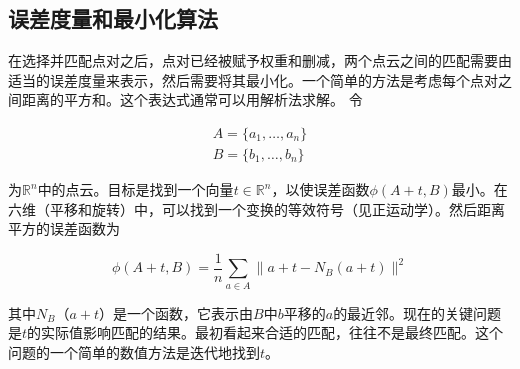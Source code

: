 
\subsection{误差度量和最小化算法}
在选择并匹配点对之后，点对已经被赋予权重和删减，两个点云之间的匹配需要由适当的误差度量来表示，然后需要将其最小化。一个简单的方法是考虑每个点对之间距离的平方和。这个表达式通常可以用解析法求解。 令

\begin{eqnarray}
A=\{a_1,\ldots,a_n\}\\
B=\{b_1,\dots,b_n\}
\end{eqnarray}


为$\mathbb{R}^n$中的点云。目标是找到一个向量$t\in\mathbb{R}^n$，以使误差函数$\phi(A+t,B)$最小。在六维（平移和旋转）中，可以找到一个变换的等效符号（见正运动学）。然后距离平方的误差函数为

\begin{equation}
\phi(A+t,B)=\frac{1}{n}\sum_{a \in A}\|a+t-N_B(a+t)\|^2
\end{equation}


其中$N_B（a+t）$是一个函数，它表示由$B$中$b$平移的$a$的最近邻。现在的关键问题是$t$的实际值影响匹配的结果。最初看起来合适的匹配，往往不是最终匹配。这个问题的一个简单的数值方法是迭代地找到$t$。

